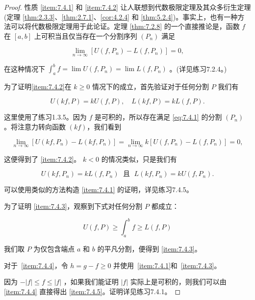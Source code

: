 \begin{proof}
性质 \ref{item:7.4.1} 和 \ref{item:7.4.2} 让人联想到代数极限定理及其众多衍生定理(定理 \ref{thm:2.3.3}、\ref{thm:2.7.1}、\ref{cor:4.2.4} 和 \ref{thm:5.2.4})。事实上，也有一种方法可以将代数极限定理用于此论证。定理 \ref{thm:7.2.8} 的一个直接推论是，函数 \(f\) 在 \(\left\lbrack  {a,b}\right\rbrack\) 上可积当且仅当存在一个分割序列 \(\left( {P}_{n}\right)\) 满足

\begin{equation}
\label{eq:7.4.1}
\mathop{\lim }\limits_{{n \rightarrow  \infty }}\left\lbrack  {U\left( {f,{P}_{n}}\right)  - L\left( {f,{P}_{n}}\right) }\right\rbrack   = 0,
\end{equation}

在这种情况下 \({\int }_{a}^{b}f = \lim U\left( {f,{P}_{n}}\right)  = \lim L\left( {f,{P}_{n}}\right)\) 。(详见练习7.2.4。)

为了证明\ref{item:7.4.2}在 \(k \geq  0\) 情况下的成立，首先验证对于任何分割 \(P\) 我们有

\[
U\left( {{kf},P}\right)  = {kU}\left( {f,P}\right) , \quad L\left( {{kf},P}\right)  = {kL}\left( {f,P}\right) .
\]

这里使用了练习1.3.5。因为 \(f\) 是可积的，所以存在满足 \ref{eq:7.4.1} 的分割 \(\left( {P}_{n}\right)\) 。将注意力转向函数 $(kf)$，我们看到

\[
\mathop{\lim }\limits_{{n \rightarrow  \infty }}\left\lbrack  {U\left( {{kf},{P}_{n}}\right)  - L\left( {{kf},{P}_{n}}\right) }\right\rbrack   = \mathop{\lim }\limits_{{n \rightarrow  \infty }}k\left\lbrack  {U\left( {f,{P}_{n}}\right)  - L\left( {f,{P}_{n}}\right) }\right\rbrack   = 0,
\]

这便得到了 \ref{item:7.4.2}。 \(k < 0\) 的情况类似，只是我们有

\[
U\left( {{kf},{P}_{n}}\right)  = {kL}\left( {f,{P}_{n}}\right) \;\text{ 且 }\;L\left( {{kf},{P}_{n}}\right)  = {kU}\left( {f,{P}_{n}}\right) .
\]

可以使用类似的方法构造 \ref{item:7.4.1} 的证明，详见练习7.4.5。

为了证明 \ref{item:7.4.3}，观察到下式对任何分割 $P$ 都成立：

\[
U\left( {f,P}\right)  \geq  {\int }_{a}^{b}f \geq  L\left( {f,P}\right)
\]

我们取 \(P\) 为仅包含端点 \(a\) 和 \(b\) 的平凡分割，便得到 \ref{item:7.4.3}。

对于~\ref{item:7.4.4}，令 \(h = g - f \geq  0\) 并使用~\ref{item:7.4.1}和~\ref{item:7.4.3}。

因为 \(- \left| f\right|  \leq  f \leq  \left| f\right|\) ，如果我们能证明 \(\left| f\right|\) 实际上是可积的，则我们可以由 \ref{item:7.4.4} 直接得出 \ref{item:7.4.5}。证明详见练习7.4.1。  
\end{proof}


